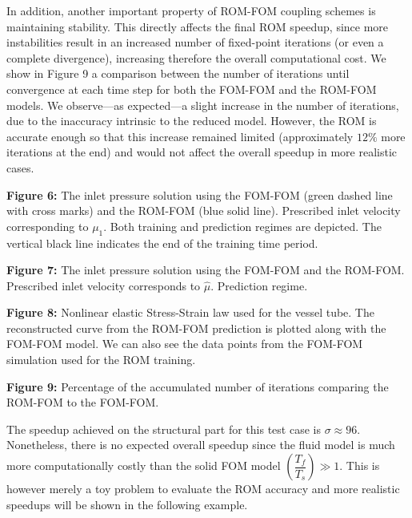 \documentclass[11pt]{article}
\begin{document}
In addition, another important property of ROM-FOM coupling schemes is maintaining stability. This directly affects the final ROM speedup, since more instabilities result in an increased number of fixed-point iterations (or even a complete divergence), increasing therefore the overall computational cost. We show in Figure 9 a comparison between the number of iterations until convergence at each time step for both the FOM-FOM and the ROM-FOM models. We observe---as expected---a slight increase in the number of iterations, due to the inaccuracy intrinsic to the reduced model. However, the ROM is accurate enough so that this increase remained limited (approximately $12\%$ more iterations at the end) and would not affect the overall speedup in more realistic cases.

\begin{center}
\textbf{Figure 6:} The inlet pressure solution using the FOM-FOM (green dashed line with cross marks) and the ROM-FOM (blue solid line). Prescribed inlet velocity corresponding to $\mu_1$. Both training and prediction regimes are depicted. The vertical black line indicates the end of the training time period.
\end{center}

\begin{center}
\textbf{Figure 7:} The inlet pressure solution using the FOM-FOM and the ROM-FOM. Prescribed inlet velocity corresponds to $\hat{\mu}$. Prediction regime.
\end{center}

\begin{center}
\textbf{Figure 8:} Nonlinear elastic Stress-Strain law used for the vessel tube. The reconstructed curve from the ROM-FOM prediction is plotted along with the FOM-FOM model. We can also see the data points from the FOM-FOM simulation used for the ROM training.
\end{center}

\begin{center}
\textbf{Figure 9:} Percentage of the accumulated number of iterations comparing the ROM-FOM to the FOM-FOM.
\end{center}

The speedup achieved on the structural part for this test case is $\sigma \approx 96$. Nonetheless, there is no expected overall speedup since the fluid model is much more computationally costly than the solid FOM model $\left(\dfrac{T_f}{T_s}\right) \gg 1$. This is however merely a toy problem to evaluate the ROM accuracy and more realistic speedups will be shown in the following example.
\end{document}
